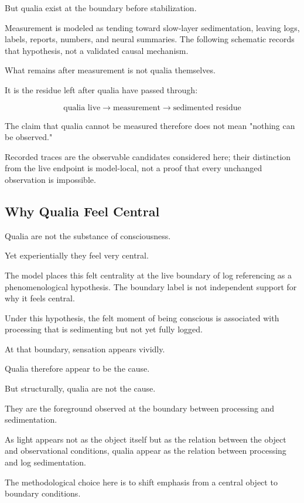But qualia exist at the boundary before stabilization.

Measurement is modeled as tending toward slow-layer sedimentation, leaving logs, labels, reports, numbers, and neural summaries. The following schematic records that hypothesis, not a validated causal mechanism.

What remains after measurement is not qualia themselves.

It is the residue left after qualia have passed through:

\begin{equation}
\text{qualia live} \rightarrow \text{measurement} \rightarrow \text{sedimented residue}
\end{equation}

The claim that qualia cannot be measured therefore does not mean "nothing can be observed."

Recorded traces are the observable candidates considered here; their distinction from the live endpoint is model-local, not a proof that every unchanged observation is impossible.

\subsection{Why Qualia Feel Central}


Qualia are not the substance of consciousness.

Yet experientially they feel very central.

The model places this felt centrality at the live boundary of log referencing as a phenomenological hypothesis. The boundary label is not independent support for why it feels central.

Under this hypothesis, the felt moment of being conscious is associated with processing that is sedimenting but not yet fully logged.

At that boundary, sensation appears vividly.

Qualia therefore appear to be the cause.

But structurally, qualia are not the cause.

They are the foreground observed at the boundary between processing and sedimentation.

As light appears not as the object itself but as the relation between the object and observational conditions, qualia appear as the relation between processing and log sedimentation.

The methodological choice here is to shift emphasis from a central object to boundary conditions.

